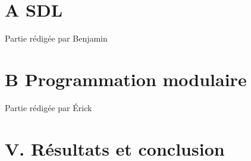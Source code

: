 \documentclass[a4paper,11pt]{article}
\begin{document}
\section*{A \hspace*{0.3cm} SDL}
\label{section:sdl}
Partie rédigée par Benjamin
\section*{B \hspace*{0.3cm} Programmation modulaire}
\label{section:programmation_modulaire}
Partie rédigée par Érick
\section*{\LARGE V. \hspace*{0.05cm} Résultats et conclusion}
\label{section*:resultats_conclusion}
\end{document}
